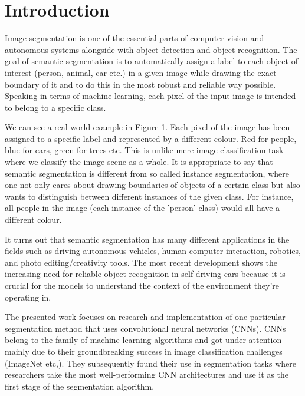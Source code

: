 \chapter{Introduction}
Image segmentation is one of the essential parts of computer vision and autonomous systems alongside with object detection and object recognition. The goal of semantic segmentation is to automatically assign a label to each object of interest (person, animal, car etc.) in a given image while drawing the exact boundary of it and to do this in the most robust and reliable way possible. Speaking in terms of machine learning, each pixel of the input image is intended to belong to a specific class.

We can see a real-world example in Figure 1. Each pixel of the image has been assigned to a specific label and represented by a different colour. Red for people, blue for cars, green for trees etc. This is unlike mere image classification task where we classify the image scene as a whole. It is appropriate to say that semantic segmentation is different from so called instance segmentation, where one not only cares about drawing boundaries of objects of a certain class but also wants to distinguish between different instances of the given class. For instance, all people in the image (each instance of the 'person' class) would all have a different colour.

It turns out that semantic segmentation has many different applications in the fields such as driving autonomous vehicles, human-computer interaction, robotics, and photo editing/creativity tools. The most recent development shows the increasing need for reliable object recognition in self-driving cars because it is crucial for the models to understand the context of the environment they’re operating in. %

The presented work focuses on research and implementation of one particular segmentation method that uses convolutional neural networks (CNNs). CNNs belong to the family of machine learning algorithms and got under attention mainly due to their groundbreaking success in image classification challenges (ImageNet etc,). They subsequently found their use in segmentation tasks where researchers take the most well-performing CNN architectures and use it as the first stage of the segmentation algorithm.


